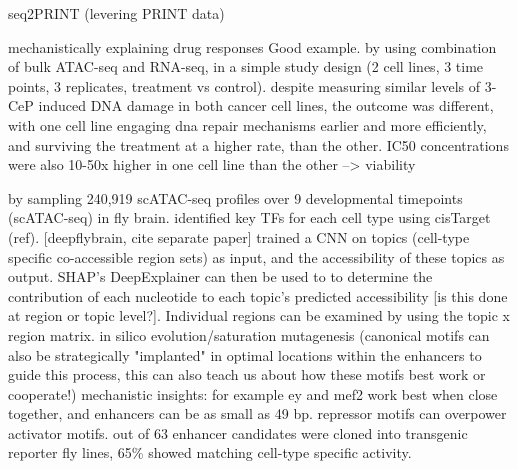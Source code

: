 seq2PRINT (levering PRINT data)

mechanistically explaining drug responses Good example. by using combination of bulk ATAC-seq and RNA-seq, in a simple study design (2 cell lines, 3 time points, 3 replicates, treatment vs control). despite measuring similar levels of 3-CeP induced DNA damage in both cancer cell lines, the outcome was different, with one cell line engaging dna repair mechanisms earlier and more efficiently, and surviving the treatment at a higher rate, than the other. IC50 concentrations were also 10-50x higher in one cell line than the other --> viability

 by sampling 240,919 scATAC-seq profiles over 9 developmental timepoints (scATAC-seq) in fly brain. identified key TFs for each cell type using cisTarget (ref). [deepflybrain, cite separate paper] trained a CNN on topics (cell-type specific co-accessible region sets) as input, and the accessibility of these topics as output. SHAP's DeepExplainer can then be used to to determine the contribution of each nucleotide to each topic's predicted accessibility [is this done at region or topic level?]. Individual regions can be examined by using the topic x region matrix. in silico evolution/saturation mutagenesis (canonical motifs can also be strategically "implanted" in optimal locations within the enhancers to guide this process, this can also teach us about how these motifs best work or cooperate!) mechanistic insights: for example ey and mef2 work best when close together, and enhancers can be as small as 49 bp. repressor motifs can overpower activator motifs. out of 63 enhancer candidates were cloned into transgenic reporter fly lines, 65\% showed matching cell-type specific activity.

